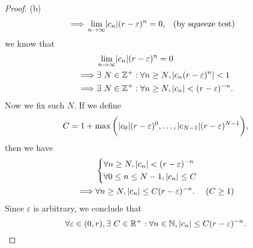 \begin{proof}{(b)}
\begin{align*}
    \implies & \lim_{n \to \infty} \abs{c_n} (r - \varepsilon)^n = 0,                                      &  & \text{(by squeeze test)}
  \end{align*}
  we know that
  \begin{align*}
             & \lim_{n \to \infty} \abs{c_n} (r - \varepsilon)^n = 0                       \\
    \implies & \exists\ N \in \Z^+ : \forall n \geq N, \abs{c_n (r - \varepsilon)^n} < 1   \\
    \implies & \exists\ N \in \Z^+ : \forall n \geq N, \abs{c_n} < (r - \varepsilon)^{-n}.
  \end{align*}
  Now we fix such \(N\).
  If we define
  \[
    C = 1 + \max\bigg(\abs{c_0} (r - \varepsilon)^0, \dots, \abs{c_{N - 1}} (r - \varepsilon)^{N - 1}\bigg),
  \]
  then we have
  \begin{align*}
             & \begin{dcases}
                 \forall n \geq N, \left\lvert c_n\right\rvert < (r - \varepsilon)^{-n} \\
                 \forall 0 \leq n \leq N - 1, \left\lvert c_n\right\rvert \leq C
               \end{dcases}                    \\
    \implies & \forall n \geq N, \left\lvert c_n\right\rvert \leq C (r - \varepsilon)^{-n}. & (C \geq 1)
  \end{align*}
  Since \(\varepsilon\) is arbitrary, we conclude that
  \[
    \forall \varepsilon \in (0, r), \exists\ C \in \mathbb{R}^+ : \forall n \in \mathbb{N}, \left\lvert c_n\right\rvert \leq C (r - \varepsilon)^{-n}.
  \]
\end{proof}


